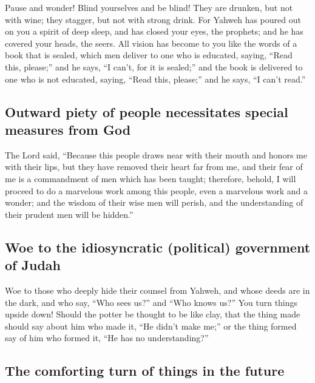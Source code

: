 \begin{paracol}{2}
\begin{otherlanguage}{english}
 Pause and wonder! Blind yourselves and be blind! They are
drunken, but not with wine; they stagger, but not with strong drink.
 For Yahweh has poured out on you a spirit of deep sleep,
and has closed your eyes, the prophets; and he has covered your heads,
the seers.  All vision has become to you like the words
of a book that is sealed, which men deliver to one who is educated,
saying, ``Read this, please;'' and he says, ``I can't, for it is
sealed;''  and the book is delivered to one who is not
educated, saying, ``Read this, please;'' and he says, ``I can't read.''

\hypertarget{outward-piety-of-people-necessitates-special-measures-from-god}{%
\subsection{Outward piety of people necessitates special measures from
God}\label{outward-piety-of-people-necessitates-special-measures-from-god}}

 The Lord said, ``Because this people draws near with
their mouth and honors me with their lips, but they have removed their
heart far from me, and their fear of me is a commandment of men which
has been taught;  therefore, behold, I will proceed to do
a marvelous work among this people, even a marvelous work and a wonder;
and the wisdom of their wise men will perish, and the understanding of
their prudent men will be hidden.''

\hypertarget{woe-to-the-idiosyncratic-political-government-of-judah}{%
\subsection{Woe to the idiosyncratic (political) government of
Judah}\label{woe-to-the-idiosyncratic-political-government-of-judah}}

 Woe to those who deeply hide their counsel from Yahweh,
and whose deeds are in the dark, and who say, ``Who sees us?'' and ``Who
knows us?''  You turn things upside down! Should the
potter be thought to be like clay, that the thing made should say about
him who made it, ``He didn't make me;'' or the thing formed say of him
who formed it, ``He has no understanding?''

\hypertarget{the-comforting-turn-of-things-in-the-future}{%
\subsection{The comforting turn of things in the
future}\label{the-comforting-turn-of-things-in-the-future}}


\end{otherlanguage}
\end{paracol}
